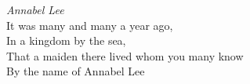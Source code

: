 \documentclass{article}
\begin{document}
  \emph{Annabel Lee}\\
  It was many and many a year ago,\\
  In a kingdom by the sea,\\
  That a maiden there lived whom you many know\\
  By the name of Annabel Lee
\end{document}
